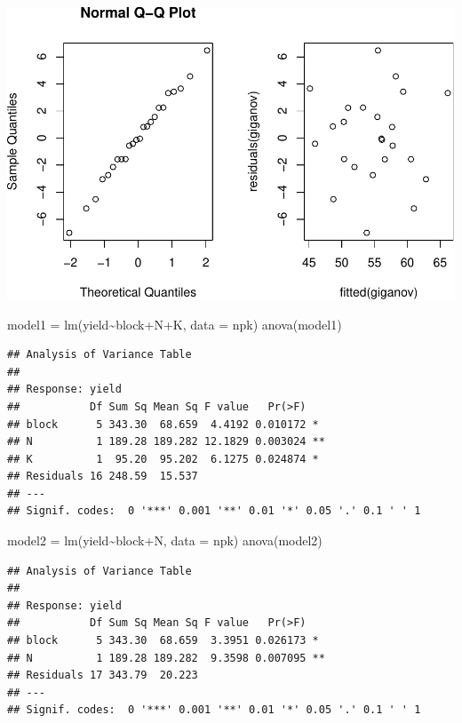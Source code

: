 \documentclass[
]{article}
\newenvironment{Shaded}{\begin{snugshade}}{\end{snugshade}}
\newcommand{\AttributeTok}[1]{\textcolor[rgb]{0.77,0.63,0.00}{#1}}
\newcommand{\FunctionTok}[1]{\textcolor[rgb]{0.00,0.00,0.00}{#1}}
\newcommand{\NormalTok}[1]{#1}
\newcommand{\OtherTok}[1]{\textcolor[rgb]{0.56,0.35,0.01}{#1}}
\newcommand{\SpecialCharTok}[1]{\textcolor[rgb]{0.00,0.00,0.00}{#1}}
\begin{document}
\includegraphics{assignment_1_files/figure-latex/unnamed-chunk-29-1.pdf}

\begin{Shaded}
\begin{Highlighting}[]
\NormalTok{model1 }\OtherTok{=} \FunctionTok{lm}\NormalTok{(yield}\SpecialCharTok{\textasciitilde{}}\NormalTok{block}\SpecialCharTok{+}\NormalTok{N}\SpecialCharTok{+}\NormalTok{K, }\AttributeTok{data =}\NormalTok{ npk)}
\FunctionTok{anova}\NormalTok{(model1)}
\end{Highlighting}
\end{Shaded}

\begin{verbatim}
## Analysis of Variance Table
## 
## Response: yield
##           Df Sum Sq Mean Sq F value   Pr(>F)   
## block      5 343.30  68.659  4.4192 0.010172 * 
## N          1 189.28 189.282 12.1829 0.003024 **
## K          1  95.20  95.202  6.1275 0.024874 * 
## Residuals 16 248.59  15.537                    
## ---
## Signif. codes:  0 '***' 0.001 '**' 0.01 '*' 0.05 '.' 0.1 ' ' 1
\end{verbatim}

\begin{Shaded}
\begin{Highlighting}[]
\NormalTok{model2 }\OtherTok{=} \FunctionTok{lm}\NormalTok{(yield}\SpecialCharTok{\textasciitilde{}}\NormalTok{block}\SpecialCharTok{+}\NormalTok{N, }\AttributeTok{data =}\NormalTok{ npk)}
\FunctionTok{anova}\NormalTok{(model2)}
\end{Highlighting}
\end{Shaded}

\begin{verbatim}
## Analysis of Variance Table
## 
## Response: yield
##           Df Sum Sq Mean Sq F value   Pr(>F)   
## block      5 343.30  68.659  3.3951 0.026173 * 
## N          1 189.28 189.282  9.3598 0.007095 **
## Residuals 17 343.79  20.223                    
## ---
## Signif. codes:  0 '***' 0.001 '**' 0.01 '*' 0.05 '.' 0.1 ' ' 1
\end{verbatim}
\end{document}
